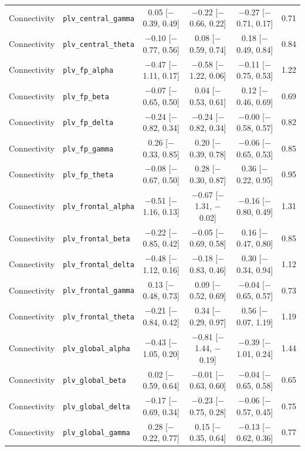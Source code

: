 {\begin{longtable}{llcccc}
Connectivity & \texttt{plv\_central\_gamma} & 0.05 [$-$0.39, 0.49] & $-$0.22 [$-$0.66, 0.22] & $-$0.27 [$-$0.71, 0.17] & 0.71 \\
Connectivity & \texttt{plv\_central\_theta} & $-$0.10 [$-$0.77, 0.56] & 0.08 [$-$0.59, 0.74] & 0.18 [$-$0.49, 0.84] & 0.84 \\
Connectivity & \texttt{plv\_fp\_alpha} & $-$0.47 [$-$1.11, 0.17] & $-$0.58 [$-$1.22, 0.06] & $-$0.11 [$-$0.75, 0.53] & 1.22 \\
Connectivity & \texttt{plv\_fp\_beta} & $-$0.07 [$-$0.65, 0.50] & 0.04 [$-$0.53, 0.61] & 0.12 [$-$0.46, 0.69] & 0.69 \\
Connectivity & \texttt{plv\_fp\_delta} & $-$0.24 [$-$0.82, 0.34] & $-$0.24 [$-$0.82, 0.34] & $-$0.00 [$-$0.58, 0.57] & 0.82 \\
Connectivity & \texttt{plv\_fp\_gamma} & 0.26 [$-$0.33, 0.85] & 0.20 [$-$0.39, 0.78] & $-$0.06 [$-$0.65, 0.53] & 0.85 \\
Connectivity & \texttt{plv\_fp\_theta} & $-$0.08 [$-$0.67, 0.50] & 0.28 [$-$0.30, 0.87] & 0.36 [$-$0.22, 0.95] & 0.95 \\
Connectivity & \texttt{plv\_frontal\_alpha} & $-$0.51 [$-$1.16, 0.13] & $-$0.67 [$-$1.31, $-$0.02] & $-$0.16 [$-$0.80, 0.49] & 1.31 \\
Connectivity & \texttt{plv\_frontal\_beta} & $-$0.22 [$-$0.85, 0.42] & $-$0.05 [$-$0.69, 0.58] & 0.16 [$-$0.47, 0.80] & 0.85 \\
Connectivity & \texttt{plv\_frontal\_delta} & $-$0.48 [$-$1.12, 0.16] & $-$0.18 [$-$0.83, 0.46] & 0.30 [$-$0.34, 0.94] & 1.12 \\
Connectivity & \texttt{plv\_frontal\_gamma} & 0.13 [$-$0.48, 0.73] & 0.09 [$-$0.52, 0.69] & $-$0.04 [$-$0.65, 0.57] & 0.73 \\
Connectivity & \texttt{plv\_frontal\_theta} & $-$0.21 [$-$0.84, 0.42] & 0.34 [$-$0.29, 0.97] & 0.56 [$-$0.07, 1.19] & 1.19 \\
Connectivity & \texttt{plv\_global\_alpha} & $-$0.43 [$-$1.05, 0.20] & $-$0.81 [$-$1.44, $-$0.19] & $-$0.39 [$-$1.01, 0.24] & 1.44 \\
Connectivity & \texttt{plv\_global\_beta} & 0.02 [$-$0.59, 0.64] & $-$0.01 [$-$0.63, 0.60] & $-$0.04 [$-$0.65, 0.58] & 0.65 \\
Connectivity & \texttt{plv\_global\_delta} & $-$0.17 [$-$0.69, 0.34] & $-$0.23 [$-$0.75, 0.28] & $-$0.06 [$-$0.57, 0.45] & 0.75 \\
Connectivity & \texttt{plv\_global\_gamma} & 0.28 [$-$0.22, 0.77] & 0.15 [$-$0.35, 0.64] & $-$0.13 [$-$0.62, 0.36] & 0.77 \\

\end{longtable}}
